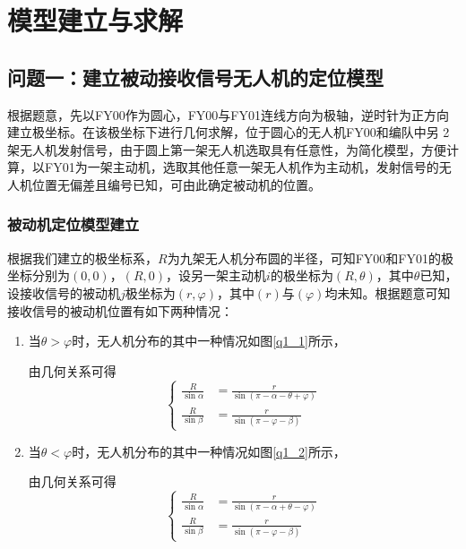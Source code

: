 \documentclass[withoutpreface,bwprint]{cumcmthesis} %
\begin{document}
\section{模型建立与求解}
\subsection{问题一：建立被动接收信号无人机的定位模型}


根据题意，先以FY00作为圆心，FY00与FY01连线方向为极轴，逆时针为正方向建立极坐标。在该极坐标下进行几何求解，位于圆心的无人机FY00和编队中另 2 架无人机发射信号，由于圆上第一架无人机选取具有任意性，为简化模型，方便计算，以FY01为一架主动机，选取其他任意一架无人机作为主动机，发射信号的无人机位置无偏差且编号已知，可由此确定被动机的位置。

\subsubsection{被动机定位模型建立}

根据我们建立的极坐标系，$R$为九架无人机分布圆的半径，可知FY00和FY01的极坐标分别为$(0,0)$，$(R,0)$，设另一架主动机$i$的极坐标为$(R,\theta)$，其中$\theta$已知，设接收信号的被动机$j$极坐标为$(r,\varphi)$，其中$(r)$与$(\varphi)$均未知。根据题意可知接收信号的被动机位置有如下两种情况：

\begin{enumerate}
    \item 当$\theta>\varphi$时，无人机分布的其中一种情况如图\ref{q1_1}所示，

    由几何关系可得
    \begin{equation}
    \left\{
    \begin{aligned}
        \frac{R}{\sin\alpha} &= \frac{r}{\sin(\pi - \alpha - \theta + \varphi)} \\
        \frac{R}{\sin\beta} &= \frac{r}{\sin(\pi - \varphi - \beta)}
    \end{aligned}
    \right.
    \label{式1}
    \end{equation}

    \item 当$\theta<\varphi$时，无人机分布的其中一种情况如图\ref{q1_2}所示，
    
    由几何关系可得
    \begin{equation}
    \left\{
    \begin{aligned}
        \frac{R}{\sin\alpha} &= \frac{r}{\sin(\pi - \alpha + \theta - \varphi)} \\
        \frac{R}{\sin\beta} &= \frac{r}{\sin(\pi - \varphi - \beta)}
    \end{aligned}
    \right.
    \label{式2}
    \end{equation}
    
\end{enumerate}
\end{document}
